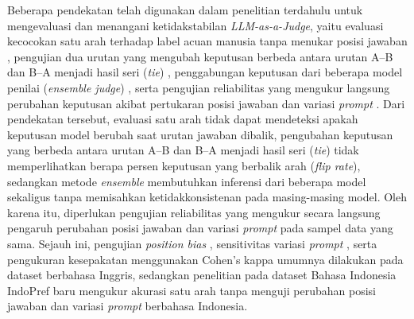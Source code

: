 Beberapa pendekatan telah digunakan dalam penelitian terdahulu untuk mengevaluasi dan menangani ketidakstabilan \textit{LLM-as-a-Judge}, yaitu evaluasi kecocokan satu arah terhadap label acuan manusia tanpa menukar posisi jawaban \cite{bavarescoLLMsInsteadHuman2025}\cite{wiyonoIndoPrefMultiDomainPairwise2025}, pengujian dua urutan yang mengubah keputusan berbeda antara urutan A--B dan B--A menjadi hasil seri (\textit{tie}) \cite{zhengJudgingLLMasaJudgeMTBench2023}\cite{liLLMsasJudgesComprehensiveSurvey2024}, penggabungan keputusan dari beberapa model penilai (\textit{ensemble judge}) \cite{fuHowReliableMultilingual2025}, serta pengujian reliabilitas yang mengukur langsung perubahan keputusan akibat pertukaran posisi jawaban \cite{shiJudgingJudgesSystematic}\cite{anghelDiagnosingBiasInstability2025} dan variasi \textit{prompt} \cite{weiSystematicEvaluationLLMasaJudge2025}\cite{bellibatluJudgeSenseBenchmarkPrompt2026}. Dari pendekatan tersebut, evaluasi satu arah tidak dapat mendeteksi apakah keputusan model berubah saat urutan jawaban dibalik, pengubahan keputusan yang berbeda antara urutan A--B dan B--A menjadi hasil seri (\textit{tie}) tidak memperlihatkan berapa persen keputusan yang berbalik arah (\textit{flip rate}), sedangkan metode \textit{ensemble} membutuhkan inferensi dari beberapa model sekaligus tanpa memisahkan ketidakkonsistenan pada masing-masing model. Oleh karena itu, diperlukan pengujian reliabilitas yang mengukur secara langsung pengaruh perubahan posisi jawaban dan variasi \textit{prompt} pada sampel data yang sama. Sejauh ini, pengujian \textit{position bias} \cite{zhengJudgingLLMasaJudgeMTBench2023}\cite{shiJudgingJudgesSystematic}, sensitivitas variasi \textit{prompt} \cite{weiSystematicEvaluationLLMasaJudge2025}\cite{bellibatluJudgeSenseBenchmarkPrompt2026}, serta pengukuran kesepakatan menggunakan Cohen's kappa \cite{normanReliabilityValiditySystematic2026}\cite{raoAgreementMetricsLLMasJudge2026} umumnya dilakukan pada dataset berbahasa Inggris, sedangkan penelitian pada dataset Bahasa Indonesia IndoPref \cite{wiyonoIndoPrefMultiDomainPairwise2025} baru mengukur akurasi satu arah tanpa menguji perubahan posisi jawaban dan variasi \textit{prompt} berbahasa Indonesia.

